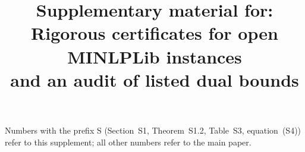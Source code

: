 \documentclass[11pt]{article}
\title{Supplementary material for:\\
  Rigorous certificates for open MINLPLib instances\\
  and an audit of listed dual bounds}
\author{}
\date{}
\begin{document}
\maketitle

\noindent
Numbers with the prefix S (Section~S1, Theorem~S1.2, Table~S3, equation~(S4)) refer to this supplement; all other numbers refer to the main paper.

\tableofcontents






















\end{document}
